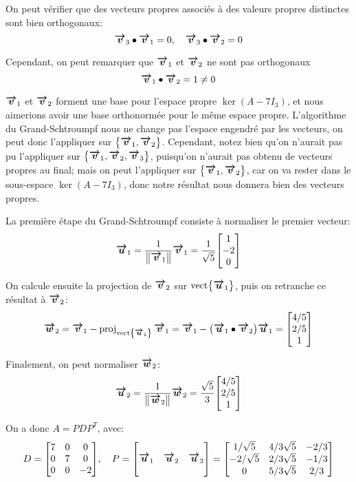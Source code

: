 \documentclass[a4paper]{article}
\begin{document}
{    On peut vérifier que des vecteurs propres associés à des valeurs propres distinctes sont bien orthogonaux:
    \[\bm{\protect\overrightarrow{v}}_3 \bullet \bm{\protect\overrightarrow{v}}_1 = 0, \quad \bm{\protect\overrightarrow{v}}_3 \bullet \bm{\protect\overrightarrow{v}}_2 = 0\]

    Cependant, on peut remarquer que $\bm{\protect\overrightarrow{v}}_1$ et $\bm{\protect\overrightarrow{v}}_2$ ne sont pas orthogonaux
    \[\bm{\protect\overrightarrow{v}}_1 \bullet \bm{\protect\overrightarrow{v}}_2 = 1 \neq 0\]

    $\bm{\protect\overrightarrow{v}}_1$ et $\bm{\protect\overrightarrow{v}}_2$ forment une base pour l'espace propre $\ker\left(A - 7I_3\right)$, et nous aimerions avoir une base orthonormée pour le même espace propre. L'algorithme du Grand-Schtroumpf nous ne change pas l'espace engendré par les vecteurs, on peut donc l'appliquer sur $\left\{\bvec{v}_1, \bvec{v}_2\right\}$. Cependant, notez bien qu'on n'aurait pas pu l'appliquer sur $\left\{\bvec{v}_1, \bvec{v}_2, \bvec{v}_3\right\}$, puisqu'on n'aurait pas obtenu de vecteurs propres au final; mais on peut l'appliquer sur $\left\{\bvec{v}_1, \bvec{v}_2\right\}$, car on va rester dans le sous-espace $\ker\left(A - 7I_3\right)$, donc notre résultat nous donnera bien des vecteurs propres.

    La première étape du Grand-Schtroumpf consiste à normaliser le premier vecteur:
    \[\bvec{u}_1 = \frac{1}{\left\|\bvec{v}_1\right\|} \bvec{v}_1 = \frac{1}{\sqrt{5}} \begin{bmatrix} 1 \\ -2 \\ 0 \end{bmatrix} \]

    On calcule ensuite la projection de $\bm{\protect\overrightarrow{v}}_2$ sur $\vect\left\{\bvec{u}_1\right\}$, puis on retranche ce résultat à $\bm{\protect\overrightarrow{v}}_2$:
    \[\bvec{w}_2 = \bvec{v}_1 - \proj_{\vect\left\{\bvec{u}_1\right\}}\bvec{v}_1 = \bvec{v}_1- \left(\bvec{u}_1 \dotprod \bvec{v}_2\right) \bvec{u}_1 = \begin{bmatrix} 4 / 5 \\ 2 / 5 \\ 1 \end{bmatrix} \]

    Finalement, on peut normaliser $\bm{\protect\overrightarrow{w}}_2$:
    \[\bvec{u}_2 = \frac{1}{\left\|\bvec{w}_2\right\|} \bvec{w}_2 = \frac{\sqrt{5}}{3} \begin{bmatrix} 4 / 5 \\ 2 / 5 \\ 1 \end{bmatrix} \]

    On a donc $A = PDP^T$, avec:
    \[D = \begin{bmatrix} 7 & 0 & 0 \\ 0 & 7 & 0 \\ 0 & 0 & -2 \end{bmatrix}, \mathspace P = \begin{bmatrix}  &  &  \\ \bvec{u}_1 & \bvec{u}_2 & \bvec{u}_3 \\  &  &  \end{bmatrix} = \begin{bmatrix} 1 / \sqrt{5} & 4 / 3\sqrt{5} & -2 / 3 \\ -2 / \sqrt{5} & 2 / 3\sqrt{5} & -1 / 3 \\ 0 & 5 / 3\sqrt{5} & 2 / 3 \end{bmatrix} \]
}
\end{document}
